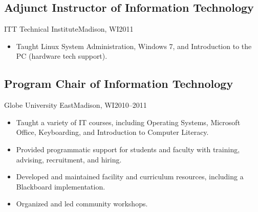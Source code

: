 \documentclass[../main.tex]{subfiles}
\begin{document}
	\subsection{Adjunct Instructor of Information Technology}{ITT Technical Institute}{Madison, WI}{2011}
	\begin{itemize}
		\item{Taught Linux System Administration, Windows 7, and Introduction to the PC (hardware tech support).}
	\end{itemize}

	\subsection{Program Chair of Information Technology}{Globe University East}{Madison, WI}{2010--2011}
	\begin{itemize}
		\item{Taught a variety of IT courses, including Operating Systems, Microsoft Office, Keyboarding, and Introduction to Computer Literacy.}
		\item{Provided programmatic support for students and faculty with training, advising, recruitment, and hiring.}
		\item{Developed and maintained facility and curriculum resources, including a Blackboard implementation.}
		\item{Organized and led community workshops.}
	\end{itemize}
\end{document}
